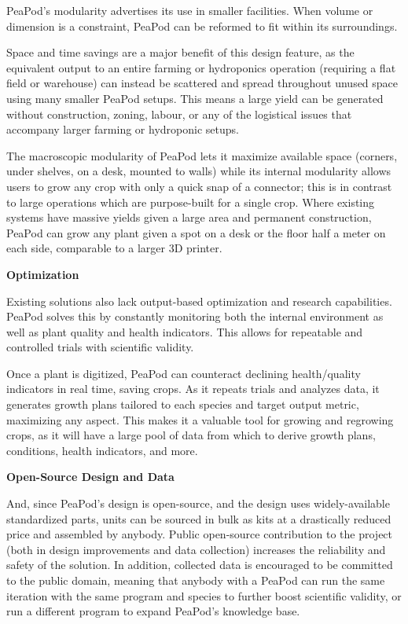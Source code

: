 \documentclass{report}
\begin{document}
PeaPod’s modularity advertises its use in smaller facilities. When volume or dimension is a constraint, PeaPod can be reformed to fit within its surroundings.

Space and time savings are a major benefit of this design feature, as the equivalent output to an entire farming or hydroponics operation (requiring a flat field or warehouse) can instead be scattered and spread throughout unused space using many smaller PeaPod setups. This means a large yield can be generated without construction, zoning, labour, or any of the logistical issues that accompany larger farming or hydroponic setups.

The macroscopic modularity of PeaPod lets it maximize available space (corners, under shelves, on a desk, mounted to walls) while its internal modularity allows users to grow any crop with only a quick snap of a connector; this is in contrast to large operations which are purpose-built for a single crop. Where existing systems have massive yields given a large area and permanent construction, PeaPod can grow any plant given a spot on a desk or the floor half a meter on each side, comparable to a larger 3D printer.

\textbf{Optimization}

Existing solutions also lack output-based optimization and research capabilities. PeaPod solves this by constantly monitoring both the internal environment as well as plant quality and health indicators. This allows for repeatable and controlled trials with scientific validity.

Once a plant is digitized, PeaPod can counteract declining health/quality indicators in real time, saving crops. As it repeats trials and analyzes data, it generates growth plans tailored to each species and target output metric, maximizing any aspect. This makes it a valuable tool for growing and regrowing crops, as it will have a large pool of data from which to derive growth plans, conditions, health indicators, and more.

\textbf{Open-Source Design and Data}

And, since PeaPod's design is open-source, and the design uses widely-available standardized parts, units can be sourced in bulk as kits at a drastically reduced price and assembled by anybody. Public open-source contribution to the project (both in design improvements and data collection) increases the reliability and safety of the solution. In addition, collected data is encouraged to be committed to the public domain, meaning that anybody with a PeaPod can run the same iteration with the same program and species to further boost scientific validity, or run a different program to expand PeaPod's knowledge base.
\end{document}
